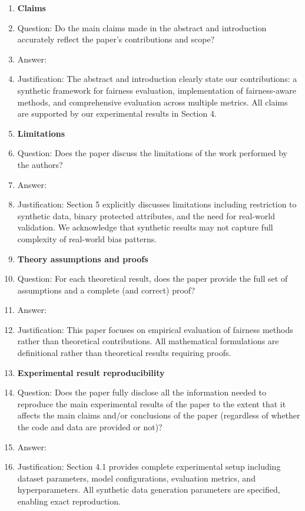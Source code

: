 \documentclass{article}
\begin{document}
\begin{enumerate}

\item {\bf Claims}
    \item[] Question: Do the main claims made in the abstract and introduction accurately reflect the paper's contributions and scope?
    \item[] Answer: \answerYes{}
    \item[] Justification: The abstract and introduction clearly state our contributions: a synthetic framework for fairness evaluation, implementation of fairness-aware methods, and comprehensive evaluation across multiple metrics. All claims are supported by our experimental results in Section 4.

\item {\bf Limitations}
    \item[] Question: Does the paper discuss the limitations of the work performed by the authors?
    \item[] Answer: \answerYes{}
    \item[] Justification: Section 5 explicitly discusses limitations including restriction to synthetic data, binary protected attributes, and the need for real-world validation. We acknowledge that synthetic results may not capture full complexity of real-world bias patterns.

\item {\bf Theory assumptions and proofs}
    \item[] Question: For each theoretical result, does the paper provide the full set of assumptions and a complete (and correct) proof?
    \item[] Answer: \answerNA{}
    \item[] Justification: This paper focuses on empirical evaluation of fairness methods rather than theoretical contributions. All mathematical formulations are definitional rather than theoretical results requiring proofs.

\item {\bf Experimental result reproducibility}
    \item[] Question: Does the paper fully disclose all the information needed to reproduce the main experimental results of the paper to the extent that it affects the main claims and/or conclusions of the paper (regardless of whether the code and data are provided or not)?
    \item[] Answer: \answerYes{}
    \item[] Justification: Section 4.1 provides complete experimental setup including dataset parameters, model configurations, evaluation metrics, and hyperparameters. All synthetic data generation parameters are specified, enabling exact reproduction.


\end{enumerate}
\end{document}
